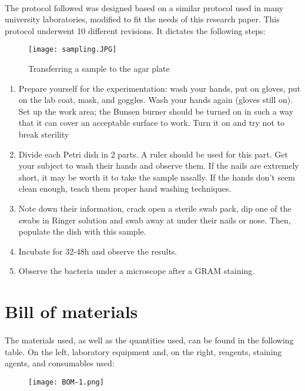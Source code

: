 \paragraph{}The protocol followed was designed based on a similar protocol used in many university laboratories\cite{olearyPracticalHandbookMicrobiology1989}, modified to fit the needs of this research paper. This protocol underwent 10 different revisions. It dictates the following steps: \newline\begin{wrapfigure}{r}{0.4\textwidth}\begin{center}\texttt{[image: sampling.JPG]}\end{center}\caption{Transferring a sample to the agar plate}\end{wrapfigure}
\begin{enumerate}[label=\arabic*)]
\item Prepare yourself for the experimentation: wash your hands, put on gloves, put on the lab coat, mask, and goggles. Wash your hands again (gloves still on). Set up the work area; the Bunsen burner should be turned on in such a way that it can cover an acceptable surface to work. Turn it on and try not to break sterility
\item Divide each Petri dish in 2 parts. A ruler should be used for this part. Get your subject to wash their hands and observe them. If the nails are extremely short, it may be worth it to take the sample nasally. If the hands don't seem clean enough, teach them proper hand washing techniques.
\item Note down their information, crack open a sterile swab pack, dip one of the swabs in Ringer solution and swab away at under their nails or nose. Then, populate the dish with this sample.
\item Incubate for 32-48h and observe the results.
\item Observe the bacteria under a microscope after a GRAM staining.
\end{enumerate}\newpage
\section{Bill of materials}
\paragraph{}The materials used, as well as the quantities used, can be found in the following table. On the left, laboratory equipment and, on the right, reagents, staining agents, and consumables used:
\begin{center}\begin{figure}[H]\centering\texttt{[image: BOM-1.png]}\end{figure}\end{center}
